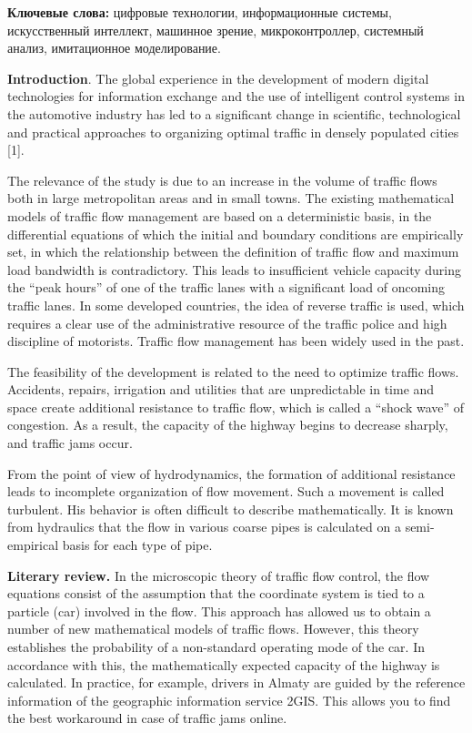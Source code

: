 {\bfseries Ключевые слова:} цифровые технологии, информационные системы,
искусственный интеллект, машинное зрение, микроконтроллер, системный
анализ, имитационное моделирование.

\begin{multicols}{2}
{\bfseries Introduction}. The global experience in the development
of modern digital technologies for information exchange and the use of
intelligent control systems in the automotive industry has led to a
significant change in scientific, technological and practical approaches
to organizing optimal traffic in densely populated cities {[}1{]}.

The relevance of the study is due to an increase in the volume of
traffic flows both in large metropolitan areas and in small towns. The
existing mathematical models of traffic flow management are based on a
deterministic basis, in the differential equations of which the initial
and boundary conditions are empirically set, in which the relationship
between the definition of traffic flow and maximum load bandwidth is
contradictory. This leads to insufficient vehicle capacity during the
``peak hours'' of one of the traffic lanes with a significant load of
oncoming traffic lanes. In some developed countries, the idea of reverse
traffic is used, which requires a clear use of the administrative
resource of the traffic police and high discipline of motorists. Traffic
flow management has been widely used in the past.

The feasibility of the development is related to the need to optimize
traffic flows. Accidents, repairs, irrigation and utilities that are
unpredictable in time and space create additional resistance to traffic
flow, which is called a ``shock wave'' of congestion. As a result, the
capacity of the highway begins to decrease sharply, and traffic jams
occur.

From the point of view of hydrodynamics, the formation of additional
resistance leads to incomplete organization of flow movement. Such a
movement is called turbulent. His behavior is often difficult to
describe mathematically. It is known from hydraulics that the flow in
various coarse pipes is calculated on a semi-empirical basis for each
type of pipe.

{\bfseries Literary review.} In the microscopic theory of traffic flow
control, the flow equations consist of the assumption that the
coordinate system is tied to a particle (car) involved in the flow. This
approach has allowed us to obtain a number of new mathematical models of
traffic flows. However, this theory establishes the probability of a
non-standard operating mode of the car. In accordance with this, the
mathematically expected capacity of the highway is calculated. In
practice, for example, drivers in Almaty are guided by the reference
information of the geographic information service 2GIS. This allows you
to find the best workaround in case of traffic jams online.


\end{multicols}
